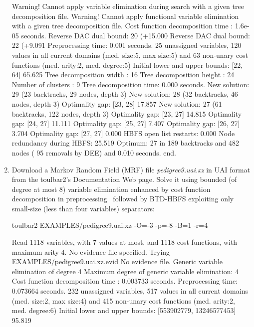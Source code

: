 \begin{enumerate}
{\begin{DoxyCode}
Warning! Cannot apply variable elimination during search with a given tree decomposition file.
Warning! Cannot apply functional variable elimination with a given tree decomposition file.
Cost function decomposition time : 1.6e-05 seconds.
Reverse DAC dual bound: 20 (+15.000%
Reverse DAC dual bound: 22 (+9.091%
Preprocessing time: 0.001 seconds.
25 unassigned variables, 120 values in all current domains (med. size:5, max size:5) and 63 non-unary cost functions (med. arity:2, med. degree:5)
Initial lower and upper bounds: [22, 64] 65.625%
Tree decomposition width  : 16
Tree decomposition height : 24
Number of clusters         : 9
Tree decomposition time: 0.000 seconds.
New solution: 29 (23 backtracks, 29 nodes, depth 3)
New solution: 28 (32 backtracks, 46 nodes, depth 3)
Optimality gap: [23, 28] 17.857 %
New solution: 27 (61 backtracks, 122 nodes, depth 3)
Optimality gap: [23, 27] 14.815 %
Optimality gap: [24, 27] 11.111 %
Optimality gap: [25, 27] 7.407 %
Optimality gap: [26, 27] 3.704 %
Optimality gap: [27, 27] 0.000 %
HBFS open list restarts: 0.000 %
Node redundancy during HBFS: 25.519 %
Optimum: 27 in 189 backtracks and 482 nodes ( 95 removals by DEE) and 0.010 seconds.
end.
\end{DoxyCode}}
\item Download a Markov Random Field (MRF) file {\em pedigree9.uai.xz} in UAI format from the toulbar2's Documentation Web page. Solve it using bounded (of degree at most 8) variable elimination enhanced by cost function decomposition in preprocessing~\cite{Favier11a} followed by BTD-HBFS exploiting only small-size (less than four variables) separators:
\begin{DoxyCode}
	toulbar2 EXAMPLES/pedigree9.uai.xz -O=-3 -p=-8 -B=1 -r=4
\end{DoxyCode}
{\scriptsize
\begin{DoxyCode}
Read 1118 variables, with 7 values at most, and 1118 cost functions, with maximum arity 4.
No evidence file specified. Trying EXAMPLES/pedigree9.uai.xz.evid
No evidence file. 
Generic variable elimination of degree 4
Maximum degree of generic variable elimination: 4
Cost function decomposition time : 0.003733 seconds.
Preprocessing time: 0.073664 seconds.
232 unassigned variables, 517 values in all current domains (med. size:2, max size:4) and 415 non-unary cost functions (med. arity:2, med. degree:6)
Initial lower and upper bounds: [553902779, 13246577453] 95.819%

\end{DoxyCode}}
\end{enumerate}
